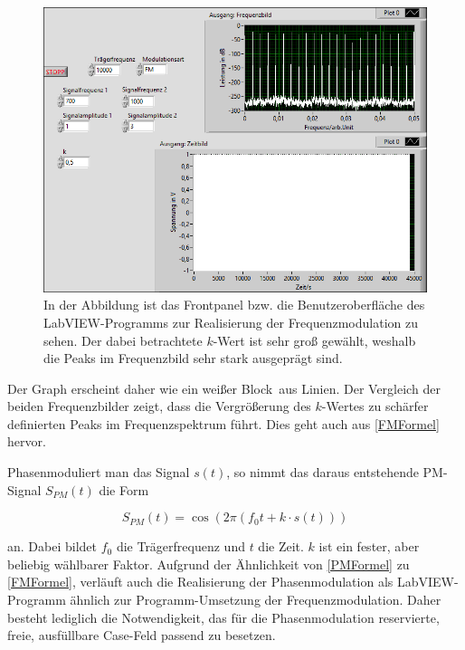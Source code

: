 \documentclass[
a4paper,
12pt,
pagesize,
ngerman
]{scrartcl}
\begin{document}
	\begin{figure}[H]
		\centering
		\includegraphics[width=1.0\textwidth]{EIRE2018Dateien/Tag4/FMPM-Erzeugung/anderekbei10000Traegerfr/FM-FMPM-Erzeugungp}
		\caption{In der Abbildung ist das Frontpanel bzw. die Benutzeroberfläche des LabVIEW-Programms zur Realisierung der Frequenzmodulation zu sehen. Der dabei betrachtete $k$-Wert ist sehr groß gewählt, weshalb die Peaks im Frequenzbild sehr stark ausgeprägt sind.}
		\label{FMAusgabegrossesk}
	\end{figure}
	
	\noindent Der Graph erscheint daher wie ein \glqq weißer Block\grqq\ aus Linien. 
	Der Vergleich der beiden Frequenzbilder zeigt, dass die Vergrößerung des $k$-Wertes zu schärfer definierten Peaks im Frequenzspektrum führt.
	Dies geht auch aus \cref{FMFormel} hervor.
	
	Phasenmoduliert man das Signal $s(t)$, so nimmt das daraus entstehende PM-Signal $S_{PM}(t)$ die Form
	
	\begin{equation} \label{PMFormel}
	S_{PM}(t) = \cos (2\pi (f_0 t + k \cdot s(t)))
	\end{equation}
	
	\noindent an. 
	Dabei bildet $f_0$ die Trägerfrequenz und $t$ die Zeit. 
	$k$ ist ein fester, aber beliebig wählbarer Faktor. 
	Aufgrund der Ähnlichkeit von \cref{PMFormel} zu \cref{FMFormel}, verläuft auch die Realisierung der Phasenmodulation als LabVIEW-Programm ähnlich zur Programm-Umsetzung der Frequenzmodulation. 
	Daher besteht lediglich die Notwendigkeit, das für die Phasenmodulation reservierte, freie, ausfüllbare Case-Feld passend zu besetzen.
	
\end{document}
